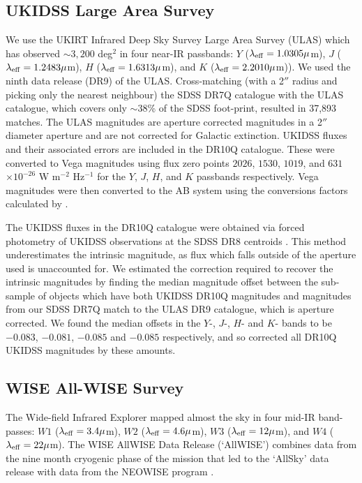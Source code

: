 \subsection{UKIDSS Large Area Survey}

We use the UKIRT Infrared Deep Sky Survey \citep[UKIDSS;][]{lawrence07} Large Area Survey (ULAS) which has observed $\sim 3,200$ deg$^2$ in four near-IR passbands: $Y$ ($\lambda_{\rm eff} = 1.0305\mu$m), $J$ ($\lambda_{\rm eff} = 1.2483\mu$m), $H$ ($\lambda_{\rm eff} = 1.6313\mu$m), and $K$ ($\lambda_{\rm eff} = 2.2010\mu$m)). 
We used the ninth data release (DR9) of the ULAS. 
Cross-matching (with a 2$''$ radius and picking only the nearest neighbour) the SDSS DR7Q catalogue with the ULAS catalogue, which covers only $\sim 38$\% of the SDSS foot-print, resulted in 37,893 matches. 
The ULAS magnitudes are aperture corrected magnitudes in a 2$''$ diameter aperture and are not corrected for Galactic extinction.
UKIDSS fluxes and their associated errors are included in the DR10Q catalogue. 
These were converted to Vega magnitudes using flux zero points $2026$, $1530$, $1019$, and $631$ $\times10^{-26}$ W m$^{-2}$ Hz$^{-1}$ for the $Y$, $J$, $H$, and $K$ passbands respectively. 
Vega magnitudes were then converted to the AB system using the conversions factors calculated by \citet{hewett06}. 

The UKIDSS fluxes in the DR10Q catalogue were obtained via forced photometry of UKIDSS observations at the SDSS DR8 centroids \citep{aihara11}. 
This method underestimates the intrinsic magnitude, as flux which falls outside of the aperture used is unaccounted for. 
We estimated the correction required to recover the intrinsic magnitudes by finding the median magnitude offset between the sub-sample of objects which have both UKIDSS DR10Q magnitudes and magnitudes from our SDSS DR7Q match to the ULAS DR9 catalogue, which is aperture corrected. 
We found the median offsets in the $Y$-, $J$-, $H$- and $K$- bands to be $-0.083$, $-0.081$, $-0.085$ and $-0.085$ respectively, and so corrected all DR10Q UKIDSS magnitudes by these amounts. 

\subsection{WISE All-WISE Survey}

The Wide-field Infrared Explorer \citep[WISE;][]{wright10} mapped almost the sky in four mid-IR band-passes: $W1$ ($\lambda_{\rm eff} = 3.4\mu$m), $W2$ ($\lambda_{\rm eff} = 4.6\mu$m), $W3$ ($\lambda_{\rm eff} = 12\mu$m), and $W4$ ($\lambda_{\rm eff} = 22\mu$m). 
The WISE AllWISE Data Release (`AllWISE') combines data from the nine month cryogenic phase of the mission that led to the `AllSky' data release with data from the NEOWISE program \citep{mainzer11}. 

